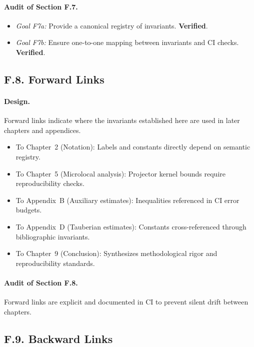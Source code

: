 \paragraph{Audit of Section F.7.}
\begin{itemize}
  \item \emph{Goal F7a:} Provide a canonical registry of invariants.
        \textbf{Verified}.
  \item \emph{Goal F7b:} Ensure one-to-one mapping between invariants
        and CI checks. \textbf{Verified}.
\end{itemize}

\subsection*{F.8. Forward Links}

\paragraph{Design.}
Forward links indicate where the invariants established here are used
in later chapters and appendices.

\begin{itemize}
  \item To Chapter~2 (Notation): Labels and constants directly depend
        on semantic registry.
  \item To Chapter~5 (Microlocal analysis): Projector kernel bounds
        require reproducibility checks.
  \item To Appendix~B (Auxiliary estimates): Inequalities referenced in
        CI error budgets.
  \item To Appendix~D (Tauberian estimates): Constants cross-referenced
        through bibliographic invariants.
  \item To Chapter~9 (Conclusion): Synthesizes methodological rigor and
        reproducibility standards.
\end{itemize}

\paragraph{Audit of Section F.8.}
Forward links are explicit and documented in CI to prevent silent drift
between chapters.

\subsection*{F.9. Backward Links}

